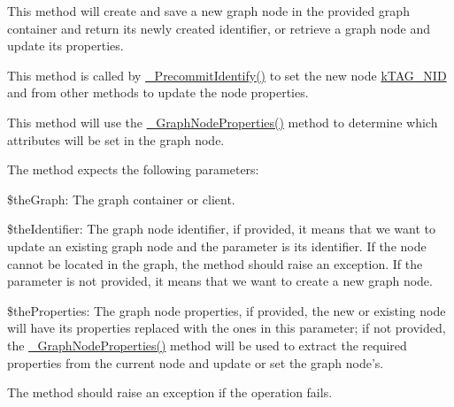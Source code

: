 This method will create and save a new graph node in the provided graph container and return its newly created identifier, or retrieve a graph node and update its properties.

This method is called by \hyperlink{class_c_ontology_node_aca703ceb64a2175b2b432bf50874015a}{\-\_\-\-Precommit\-Identify()} to set the new node \hyperlink{}{k\-T\-A\-G\-\_\-\-N\-I\-D} and from other methods to update the node properties.

This method will use the \hyperlink{class_c_ontology_node_a1b13e21b3b634b6fd66d5dce38a79b9a}{\-\_\-\-Graph\-Node\-Properties()} method to determine which attributes will be set in the graph node.

The method expects the following parameters\-:


\begin{DoxyItemize}
\item {\ttfamily \$the\-Graph}\-: The graph container or client. 
\item {\ttfamily \$the\-Identifier}\-: The graph node identifier, if provided, it means that we want to update an existing graph node and the parameter is its identifier. If the node cannot be located in the graph, the method should raise an exception. If the parameter is not provided, it means that we want to create a new graph node. 
\item {\ttfamily \$the\-Properties}\-: The graph node properties, if provided, the new or existing node will have its properties replaced with the ones in this parameter; if not provided, the \hyperlink{class_c_ontology_node_a1b13e21b3b634b6fd66d5dce38a79b9a}{\-\_\-\-Graph\-Node\-Properties()} method will be used to extract the required properties from the current node and update or set the graph node's. 
\end{DoxyItemize}

The method should raise an exception if the operation fails.


